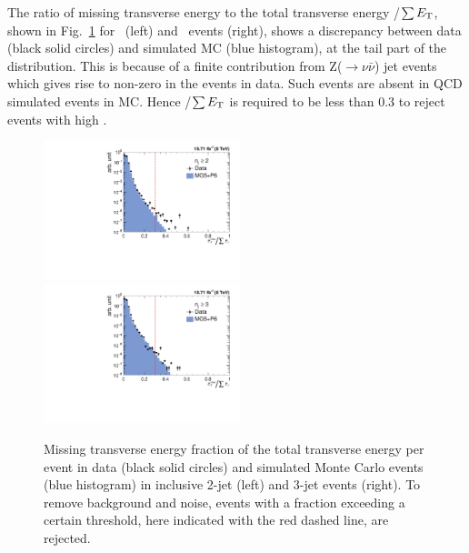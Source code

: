 The ratio of missing transverse energy to the total transverse energy \ETmiss/$\sum E_{\mathrm{T}}$, shown in Fig.~\ref{fig:metcut} for \njt~(left) and \njth~events (right), shows a discrepancy between data (black solid circles) and simulated MC (blue histogram), at the tail part of the distribution. This is because of a finite contribution from Z($\rightarrow \nu \bar{\nu}$) \plus jet events which gives rise to non-zero \ET in the events in data. Such events are absent in QCD simulated events in MC. Hence \ETmiss/$\sum E_{\mathrm{T}}$ is required to be less than 0.3 to reject events with high \ETmiss.

\begin{figure}[!htbp]
\centering
 \hspace*{-2mm}\includegraphics[width=0.51\textwidth]{Plots_HT_2_150/Missing_ET_2.pdf}%
 ~~\includegraphics[width=0.51\textwidth]{Plots_HT_2_150/Missing_ET_3.pdf}
 \caption{Missing transverse energy fraction of the total transverse energy per event in data (black solid circles) and simulated Monte Carlo events (blue histogram) in inclusive 2-jet (left) and 3-jet events (right). To remove background and noise, events with a fraction exceeding a certain threshold, here indicated with the red dashed line, are rejected.}
 \label{fig:metcut}
\end{figure} 

